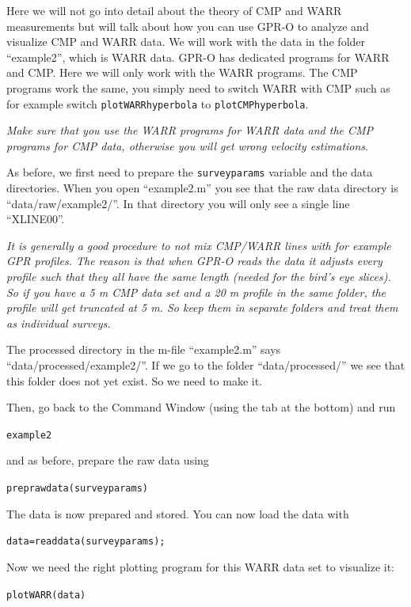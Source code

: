 \documentclass[11pt]{article}
\begin{document}
Here we will not go into detail about the theory of CMP and WARR
measurements but will talk about how you can use GPR-O to analyze and
visualize CMP and WARR data. We will work with the data in the folder
``example2'', which is WARR data. GPR-O has dedicated programs for
WARR and CMP. Here we will only work with the WARR programs. The CMP
programs work the same, you simply need to switch WARR with CMP such
as for example switch \verb#plotWARRhyperbola# to
\verb#plotCMPhyperbola#.

\emph{Make sure that you use the WARR programs for WARR data and the
  CMP programs for CMP data, otherwise you will get wrong velocity
  estimations}.

As before, we first need to prepare the \verb#surveyparams# variable
and the data directories. When you open ``example2.m'' you see that
the raw data directory is ``data/raw/example2/''. In that directory
you will only see a single line ``XLINE00''.

\emph{It is generally a good procedure to not mix CMP/WARR lines with
  for example GPR profiles. The reason is that when GPR-O reads the
  data it adjusts every profile such that they all have the same
  length (needed for the bird's eye slices). So if you have a 5 m CMP
  data set and a 20 m profile in the same folder, the profile will get
  truncated at 5 m. So keep them in separate folders and treat them as
  individual surveys.}

The processed directory in the m-file ``example2.m'' says
``data/processed/example2/''. If we go to the folder
``data/processed/'' we see that this folder does not yet exist. So we
need to make it.

Then, go back to the Command Window (using the tab at the bottom) and
run

\qquad \verb#example2#

and as before, prepare the raw data using

\qquad \verb#preprawdata(surveyparams)#

The data is now prepared and stored. You can now load the data with

\qquad \verb#data=readdata(surveyparams);#

Now we need the right plotting program for this WARR data set to
visualize it:

\qquad \verb#plotWARR(data)#
 
\end{document}
